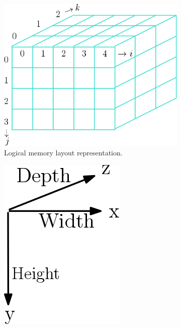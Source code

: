 \begin{figure}[htp]
  \centering
  \begin{subfigure}[b]{0.35\textwidth}
    \includegraphics[width=\textwidth]{img/array3D}
    \caption{Logical memory layout representation.}
  \label{fig:3a}
  \end{subfigure}
  \hspace*{4cm}
  \begin{subfigure}[b]{0.2\textwidth}
    \includegraphics[width=\textwidth]{img/arrow3D}

\end{subfigure}
\end{figure}
